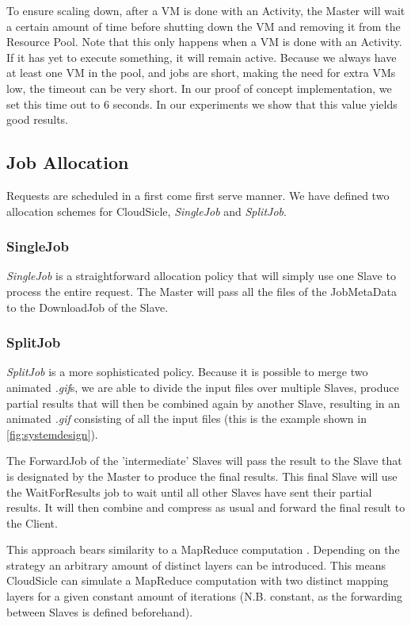 \documentclass[twocolumn,twoside]{IEEEtran}
\begin{document}
To ensure scaling down, after a VM is done with an Activity, the Master will wait a certain amount of time before shutting down the VM and removing it from the Resource Pool. Note that this only happens when a VM is done with an Activity. If it has yet to execute something, it will remain active. Because we always have at least one VM in the pool, and jobs are short, making the need for extra VMs low, the timeout can be very short. In  our proof of concept implementation, we set this time out to 6 seconds. In our experiments we show that this value yields good results.

\subsection{Job Allocation}
Requests are scheduled in a first come first serve manner. We have defined two allocation schemes for CloudSicle, \emph{SingleJob} and \emph{SplitJob}.
\subsubsection{SingleJob} 
\emph{SingleJob} is a straightforward allocation policy that will simply use one Slave to process the entire request. The Master will pass all the files of the JobMetaData to the DownloadJob of the Slave.
\subsubsection{SplitJob}
\emph{SplitJob} is a more sophisticated policy. Because it is possible to merge two animated \textit{.gif}s, we are able to divide the input files over multiple Slaves, produce partial results that will then be combined again by another Slave, resulting in an animated \textit{.gif} consisting of all the input files (this is the example shown in \autoref{fig:systemdesign}). 

The ForwardJob of the 'intermediate' Slaves will pass the result to the Slave that is designated by the Master to produce the final results. This final Slave will use the WaitForResults job to wait until all other Slaves have sent their partial results. It will then combine and compress as usual and forward the final result to the Client.

This approach bears similarity to a MapReduce computation \cite{MapReduce}.
Depending on the strategy an arbitrary amount of distinct
layers can be introduced. This means CloudSicle can simulate
a MapReduce computation with two distinct mapping layers for
a given constant amount of iterations (N.B. constant, as the forwarding between
Slaves is defined beforehand).
\end{document}
